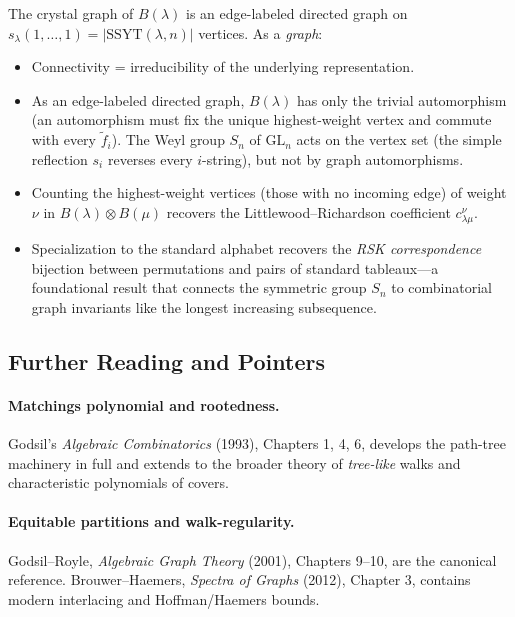 The crystal graph of $B(\lambda)$ is an edge-labeled directed graph
on $s_\lambda(1, \ldots, 1) = |\mathrm{SSYT}(\lambda, n)|$ vertices. As a \emph{graph}:
\begin{itemize}
  \item Connectivity = irreducibility of the underlying representation.
  \item As an edge-labeled directed graph, $B(\lambda)$ has only the
        trivial automorphism (an automorphism must fix the unique
        highest-weight vertex and commute with every $\widetilde f_i$).
        The Weyl group $S_n$ of $\mathrm{GL}_n$ acts on the vertex set
        (the simple reflection $s_i$ reverses every $i$-string), but not
        by graph automorphisms.
  \item Counting the highest-weight vertices (those with no incoming
        edge) of weight $\nu$ in $B(\lambda) \otimes B(\mu)$ recovers
        the Littlewood--Richardson coefficient $c^{\nu}_{\lambda\mu}$.
  \item Specialization to the standard alphabet recovers the
        \emph{RSK correspondence} bijection between permutations and
        pairs of standard tableaux---a foundational result that
        connects the symmetric group $S_n$ to combinatorial graph
        invariants like the longest increasing subsequence.
\end{itemize}

\subsection{Further Reading and Pointers}

\paragraph{Matchings polynomial and rootedness.} Godsil's
\emph{Algebraic Combinatorics} (1993), Chapters 1, 4, 6, develops the
path-tree machinery in full and extends to the broader theory of
\emph{tree-like} walks and characteristic polynomials of covers.

\paragraph{Equitable partitions and walk-regularity.} Godsil--Royle,
\emph{Algebraic Graph Theory} (2001), Chapters 9--10, are the
canonical reference. Brouwer--Haemers, \emph{Spectra of Graphs}
(2012), Chapter 3, contains modern interlacing and Hoffman/Haemers
bounds.

